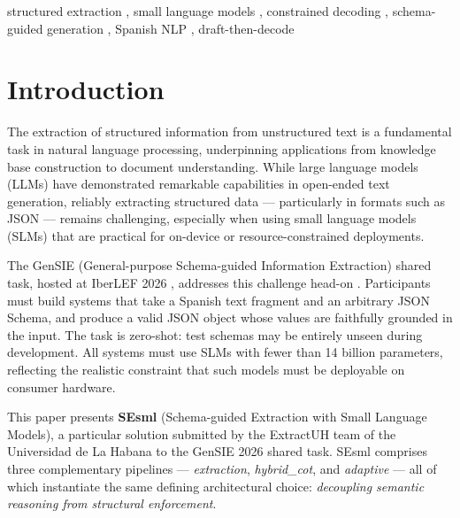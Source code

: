 \documentclass{ceurart}
\begin{document}
\begin{keywords}
structured extraction \sep
small language models \sep
constrained decoding \sep
schema-guided generation \sep
Spanish NLP \sep
draft-then-decode
\end{keywords}

\maketitle

\section{Introduction}

The extraction of structured information from unstructured text is a fundamental task
in natural language processing, underpinning applications from knowledge base
construction to document understanding.
While large language models (LLMs) have demonstrated remarkable capabilities in
open-ended text generation, reliably extracting structured data --- particularly in
formats such as JSON --- remains challenging, especially when using small language
models (SLMs) that are practical for on-device or resource-constrained deployments.

The GenSIE (General-purpose Schema-guided Information Extraction) shared task, hosted
at IberLEF 2026 \cite{iberlef2026overview}, addresses this challenge head-on
\cite{gensie2026overview}.
Participants must build systems that take a Spanish text fragment and an arbitrary
JSON Schema, and produce a valid JSON object whose values are faithfully grounded
in the input.
The task is zero-shot: test schemas may be entirely unseen during development.
All systems must use SLMs with fewer than 14 billion parameters, reflecting the
realistic constraint that such models must be deployable on consumer hardware.

This paper presents \textbf{SEsml} (Schema-guided Extraction with Small Language
Models), a particular solution submitted by the ExtractUH team of the Universidad
de La Habana to the GenSIE 2026 shared task.
SEsml comprises three complementary pipelines --- \emph{extraction}, \emph{hybrid\_cot},
and \emph{adaptive} --- all of which instantiate the same defining architectural choice:
\emph{decoupling semantic reasoning from structural enforcement}.
\end{document}

